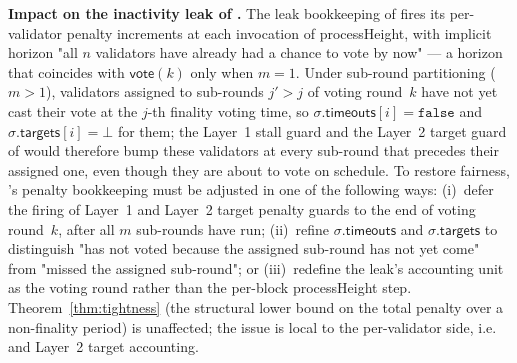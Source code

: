 \ifx\litemode\undefined\documentclass{article}\fi
\newcommand{\targets}{\mathsf{targets}}
\newcommand{\timeouts}{\mathsf{timeouts}}
\newcommand{\processHeight}{\textsf{processHeight}\xspace}
\newcommand{\vote}{\ensuremath{\mathsf{vote}}}
\renewcommand{\paragraph}[1]{\vspace{7pt}\noindent\textbf{#1}}
\theoremstyle{plain}
\theoremstyle{definition}
\theoremstyle{remark}
\begin{document}
\paragraph{Impact on the inactivity leak of .}
The leak bookkeeping of  fires its per-validator penalty increments at each invocation of \processHeight{}, with implicit horizon "all $n$ validators have already had a chance to vote by now" --- a horizon that coincides with $\vote(k)$ only when $m = 1$.
Under sub-round partitioning ($m > 1$), validators assigned to sub-rounds $j' > j$ of voting round~$k$ have not yet cast their vote at the $j$-th finality voting time, so $\sigma.\timeouts[i] = \mathtt{false}$ and $\sigma.\targets[i] = \bot$ for them; the Layer~1 stall guard and the Layer~2 target guard of  would therefore bump these validators at every sub-round that precedes their assigned one, even though they are about to vote on schedule.
To restore fairness, 's penalty bookkeeping must be adjusted in one of the following ways: (i)~defer the firing of Layer~1 and Layer~2 target penalty guards to the end of voting round~$k$, after all $m$ sub-rounds have run; (ii)~refine $\sigma.\timeouts$ and $\sigma.\targets$ to distinguish "has not voted because the assigned sub-round has not yet come" from "missed the assigned sub-round"; or (iii)~redefine the leak's accounting unit as the voting round rather than the per-block \processHeight{} step.
Theorem~\ref{thm:tightness} (the structural lower bound on the total penalty over a non-finality period) is unaffected; the issue is local to the per-validator side, i.e.\  and Layer~2 target accounting.
\end{document}
